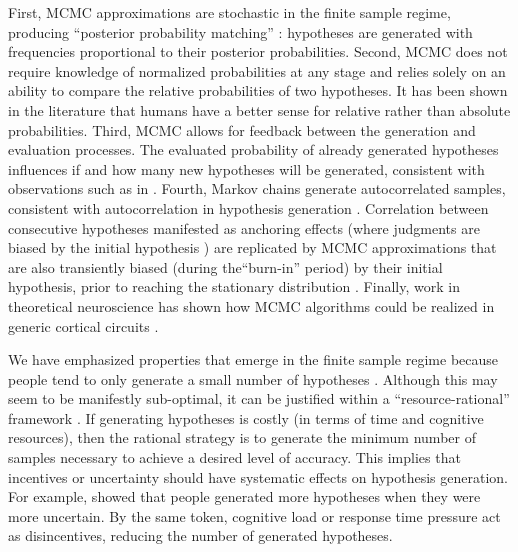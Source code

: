 First, MCMC approximations are stochastic in the finite sample regime, producing ``posterior probability matching'' \citep{wozny2010,Denison2013,Moreno11,Vul2014}: hypotheses are generated with frequencies proportional to their posterior probabilities. Second, MCMC does not require knowledge of normalized probabilities at any stage and relies solely on an ability to compare the relative probabilities of two hypotheses. It has been shown in the literature \citep{stewart06} that humans have a better sense for relative rather than absolute probabilities. Third, MCMC allows for feedback between the generation and evaluation processes. The evaluated probability of already generated hypotheses influences if and how many new hypotheses will be generated, consistent with observations such as in \citet{hamrick2015think}. Fourth, Markov chains generate autocorrelated samples, consistent with autocorrelation in hypothesis generation \citep{multistability,vul08,Bonawitz2014}. Correlation between consecutive hypotheses manifested as anchoring effects (where judgments are biased by the initial hypothesis \citep{tversky}) are replicated by MCMC approximations that are also transiently biased (during the``burn-in'' period) by their initial hypothesis, prior to reaching the stationary distribution \citep{Lieder2013}. Finally, work in theoretical neuroscience has shown how MCMC algorithms could be realized in generic cortical circuits \citep{buesing11,pecevski11,Moreno11}.


We have emphasized properties that emerge in the finite sample regime because people tend to only generate a small number of hypotheses \citep{klein1999,ross96,Gettys1979,weber1993,dougherty1997}. Although this may seem to be manifestly sub-optimal, it can be justified within a ``resource-rational'' framework \citep{Vul2014,griffiths2015,Gershman2015,schulz2016simple}. If generating hypotheses is costly (in terms of time and cognitive resources), then the rational strategy is to generate the minimum number of samples necessary to achieve a desired level of accuracy. This implies that incentives or uncertainty should have systematic effects on hypothesis generation. For example, \citet{hamrick2015think} showed that people generated more hypotheses when they were more uncertain. By the same token, cognitive load \citep{sprenger2011} or response time pressure \citep{Dougherty2003} act as disincentives, reducing the number of generated hypotheses.

